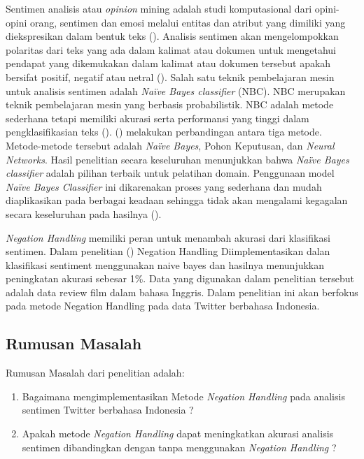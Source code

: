 Sentimen analisis atau \textit{opinion} mining adalah studi komputasional dari opini-opini orang, sentimen dan emosi melalui entitas dan atribut yang dimiliki yang diekspresikan dalam bentuk teks \citeauthor{LIU2012} (\cite*{LIU2012}). Analisis sentimen akan mengelompokkan polaritas dari teks yang ada dalam kalimat atau dokumen untuk mengetahui pendapat yang dikemukakan dalam kalimat atau dokumen tersebut apakah bersifat positif, negatif atau netral \cite{Pang+Lee+Vaithyanathan:02a} (\cite*{Pang+Lee+Vaithyanathan:02a}). Salah satu teknik pembelajaran mesin untuk analisis sentimen adalah \textit{Naïve Bayes classifier} (NBC). NBC merupakan teknik pembelajaran mesin yang berbasis probabilistik. NBC adalah metode sederhana tetapi memiliki akurasi serta performansi yang tinggi dalam pengklasifikasian teks (\cite{key:article}). \citeauthor{cogprints6708} (\citeauthor*{cogprints6708}) melakukan perbandingan antara tiga metode. Metode-metode tersebut adalah \textit{Naïve Bayes}, Pohon Keputusan, dan \textit{Neural Networks}. Hasil penelitian secara keseluruhan menunjukkan bahwa \textit{Naïve Bayes classifier} adalah pilihan terbaik untuk pelatihan domain. Penggunaan model \textit{Naïve Bayes Classifier} ini dikarenakan proses yang sederhana dan mudah diaplikasikan pada berbagai keadaan sehingga tidak akan mengalami kegagalan secara keseluruhan pada hasilnya (\cite{MANNING2008}).

\textit{Negation Handling} memiliki peran untuk menambah akurasi dari klasifikasi sentimen. Dalam penelitian \citeauthor{NARAYANAN2013} (\citeauthor*{NARAYANAN2013}) Negation Handling Diimplementasikan dalan klasifikasi sentiment menggunakan naive bayes dan hasilnya menunjukkan peningkatan akurasi sebesar 1\%. Data yang digunakan dalam penelitian tersebut adalah data review film dalam bahasa Inggris. Dalam penelitian ini akan berfokus pada metode Negation Handling pada data Twitter berbahasa Indonesia.


\subsection*{Rumusan Masalah}
Rumusan Masalah dari penelitian adalah:
\begin{enumerate}[noitemsep] 
	\item Bagaimana mengimplementasikan Metode \textit{Negation Handling} pada analisis sentimen Twitter berbahasa Indonesia ?
	\item Apakah metode \textit{Negation Handling} dapat meningkatkan akurasi analisis sentimen dibandingkan dengan tanpa menggunakan \textit{Negation Handling} ?
\end{enumerate}

